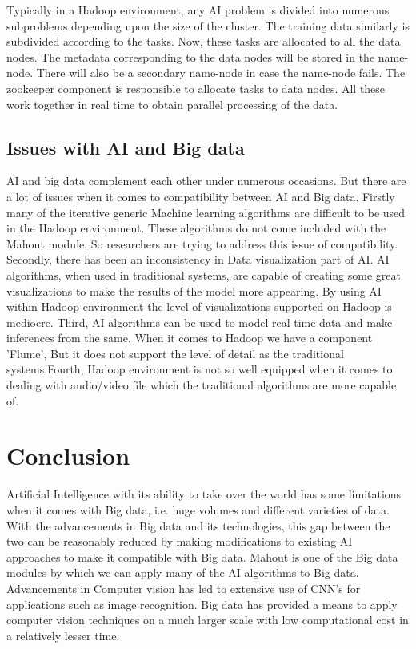 \documentclass[sigconf]{acmart}
\begin{document}
Typically in a Hadoop environment, any AI problem is divided into numerous subproblems depending upon the size of the cluster. The training data similarly is subdivided according to the tasks. Now, these tasks are allocated to all the data nodes. The metadata corresponding to the data nodes will be stored in the name-node. There will also be a secondary name-node in case the name-node fails. The zookeeper component is responsible to allocate tasks to data nodes. All these work together in real time to obtain parallel processing of the data. \cite{OLeary}

\subsection{Issues with AI and Big data}

AI and big data complement each other under numerous occasions. But there are a lot of issues when it comes to compatibility between AI and Big data. Firstly many of the iterative generic Machine learning algorithms are difficult to be used in the Hadoop environment. These algorithms do not come included with the Mahout module. So researchers are trying to address this issue of compatibility. Secondly, there has been an inconsistency in Data visualization part of AI. AI algorithms, when used in traditional systems, are capable of creating some great visualizations to make the results of the model more appearing. By using AI within Hadoop environment the level of visualizations supported on Hadoop is mediocre. Third, AI algorithms can be used to model real-time data and make inferences from the same. When it comes to Hadoop we have a component 'Flume', But it does not support the level of detail as the traditional systems.Fourth, Hadoop environment is not so well equipped when it comes to dealing with audio/video file which the traditional algorithms are more capable of. \cite{OLeary}

\section{Conclusion}
Artificial Intelligence with its ability to take over the world has some limitations when it comes with Big data, i.e. huge volumes and different varieties of data. With the advancements in Big data and its technologies, this gap between the two can be reasonably reduced by making modifications to existing AI approaches to make it compatible with Big data. Mahout is one of the Big data modules by which we can apply many of the AI algorithms to Big data. Advancements in Computer vision has led to extensive use of CNN's for applications such as image recognition. Big data has provided a means to apply computer vision techniques on a much larger scale with low computational cost in a relatively lesser time. 
\end{document}
